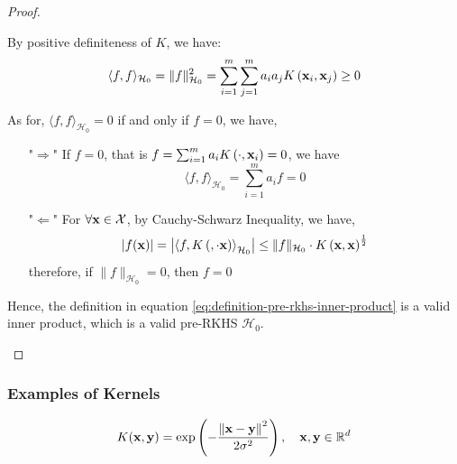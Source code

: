 \begin{proof}
\begin{enumerate}
\begin{enumerate}
			            By positive definiteness of $K$, we have:
			            \begin{equation*}
				            \langle f,f\rangle_{\mathcal{H}_{0}}=\|f\|_{\mathcal{H}_{0}}^{2}=\sum_{i=1}^{m}\sum_{j=1}^{m}a_{i}a_{j}K\left({\bf x}_{i},{\bf x}_{j}\right)\geq 0
			            \end{equation*}

			            As for, $\langle f,f\rangle_{\mathcal{H}_{0}}=0$ if and only if $f=0$, we have,
			            \begin{itemize}
				            \item["$\Rightarrow$"] If $f=0$, that is $f=\sum_{i=1}^{m}a_{i}K\left(\cdot,{\bf x}_{i}\right)=0$, we have
				                  \begin{equation*}
					                  \langle f,f\rangle_{\mathcal{H}_{0}}=\sum_{i=1}^{m}a_{i}f=0
				                  \end{equation*}
				            \item["$\Leftarrow$"] For $\forall{\bf x}\in{\mathcal X}$, by Cauchy-Schwarz Inequality, we have,
				                  \begin{equation*}
					                  |f({\bf x})|=\left|\left\langle f,K\left(,\cdot{{\bf x}}\right)\right\rangle_{\mathcal{H}_{0}}\right|\leq\|f\|_{\mathcal{H}_{0}}\cdot K\left({\bf x},{\bf x}\right)^{\frac{1}{2}}
				                  \end{equation*}
				                  therefore, if $\|f\|_{\mathcal{H}_{0}}=0$, then $f=0$
			            \end{itemize}
		      \end{enumerate}
		      Hence, the definition in equation \eqref{eq:definition-pre-rkhs-inner-product} is a valid inner product, which is a valid pre-RKHS $\mathcal{H}_{0}$.
	\end{enumerate}
\end{proof}

\subsubsection{Examples of Kernels}

\begin{example}
	\begin{equation}
		K({\bf x},\mathbf{y})=\exp\left(-\frac{\left\|{\bf x}-\mathbf{y}\right\|^{2}}{2\sigma^{2}}\right),\quad{\bf x},\mathbf{y}\in{\mathbb R}^{d}
	\end{equation}
\end{example}

